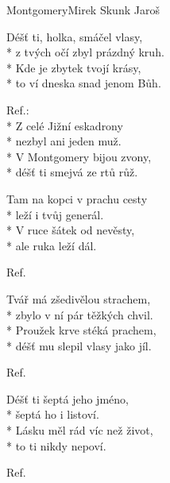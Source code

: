 \documentclass[10.5pt]{book}
\begin{document}
\begin{poem}{Montgomery}{Mirek Skunk Jaroš}

\settowidth{\versewidth}{déšť mu slepil vlasy jako jíl.}

Déšť ti, holka, smáčel vlasy,\\*
z tvých očí zbyl prázdný kruh.\\*
Kde je zbytek tvojí krásy,\\*
to ví dneska snad jenom Bůh.

Ref.:\\*
Z celé Jižní eskadrony\\*
nezbyl ani jeden muž.\\*
V Montgomery bijou zvony,\\*
déšť ti smejvá ze rtů růž.

Tam na kopci v prachu cesty\\*
leží i tvůj generál.\\*
V ruce šátek od nevěsty,\\*
ale ruka leží dál.

Ref.

Tvář má zšedivělou strachem,\\*
zbylo v ní pár těžkých chvil.\\*
Proužek krve stéká prachem,\\*
déšť mu slepil vlasy jako jíl.

Ref.

Déšť ti šeptá jeho jméno,\\*
šeptá ho i listoví.\\*
Lásku měl rád víc než život,\\*
to ti nikdy nepoví.

Ref.

\end{poem}
\end{document}
